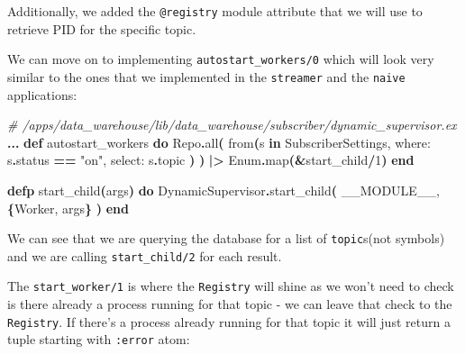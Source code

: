 \documentclass[
  oneside]{book}
\newenvironment{Shaded}{\begin{snugshade}}{\end{snugshade}}
\newcommand{\CommentTok}[1]{\textcolor[rgb]{0.56,0.35,0.01}{\textit{#1}}}
\newcommand{\ConstantTok}[1]{\textcolor[rgb]{0.56,0.35,0.01}{#1}}
\newcommand{\DecValTok}[1]{\textcolor[rgb]{0.00,0.00,0.81}{#1}}
\newcommand{\FunctionTok}[1]{\textcolor[rgb]{0.13,0.29,0.53}{\textbf{#1}}}
\newcommand{\KeywordTok}[1]{\textcolor[rgb]{0.13,0.29,0.53}{\textbf{#1}}}
\newcommand{\NormalTok}[1]{#1}
\newcommand{\OperatorTok}[1]{\textcolor[rgb]{0.81,0.36,0.00}{\textbf{#1}}}
\newcommand{\StringTok}[1]{\textcolor[rgb]{0.31,0.60,0.02}{#1}}
\newcommand{\VariableTok}[1]{\textcolor[rgb]{0.00,0.00,0.00}{#1}}
\begin{document}
Additionally, we added the \texttt{@registry} module attribute that we will use to retrieve PID for the specific topic.

We can move on to implementing \texttt{autostart\_workers/0} which will look very similar to the ones that we implemented in the \texttt{streamer} and the \texttt{naive} applications:

\begin{Shaded}
\begin{Highlighting}[]
  \CommentTok{\# /apps/data\_warehouse/lib/data\_warehouse/subscriber/dynamic\_supervisor.ex}
  \OperatorTok{...}
  \KeywordTok{def}\NormalTok{ autostart\_workers }\KeywordTok{do}
    \ConstantTok{Repo}\OperatorTok{.}\NormalTok{all}\FunctionTok{(}
\NormalTok{      from}\FunctionTok{(}\NormalTok{s }\KeywordTok{in} \ConstantTok{SubscriberSettings}\NormalTok{,}
        \VariableTok{where:}\NormalTok{ s}\OperatorTok{.}\NormalTok{status }\OperatorTok{==} \StringTok{"on"}\NormalTok{,}
        \VariableTok{select:}\NormalTok{ s}\OperatorTok{.}\NormalTok{topic}
      \FunctionTok{)}
    \FunctionTok{)}
    \OperatorTok{|\textgreater{}} \ConstantTok{Enum}\OperatorTok{.}\NormalTok{map}\FunctionTok{(}\OperatorTok{\&}\NormalTok{start\_child}\OperatorTok{/}\DecValTok{1}\FunctionTok{)}
  \KeywordTok{end}

  \KeywordTok{defp}\NormalTok{ start\_child}\FunctionTok{(}\NormalTok{args}\FunctionTok{)} \KeywordTok{do}
    \ConstantTok{DynamicSupervisor}\OperatorTok{.}\NormalTok{start\_child}\FunctionTok{(}
      \ConstantTok{\_\_MODULE\_\_}\NormalTok{,}
      \FunctionTok{\{}\ConstantTok{Worker}\NormalTok{, args}\FunctionTok{\}}
    \FunctionTok{)}
  \KeywordTok{end}
\end{Highlighting}
\end{Shaded}

We can see that we are querying the database for a list of \texttt{topic}s(not symbols) and we are calling \texttt{start\_child/2} for each result.

The \texttt{start\_worker/1} is where the \texttt{Registry} will shine as we won't need to check is there already a process running for that topic - we can leave that check to the \texttt{Registry}. If there's a process already running for that topic it will just return a tuple starting with \texttt{:error} atom:
\end{document}

